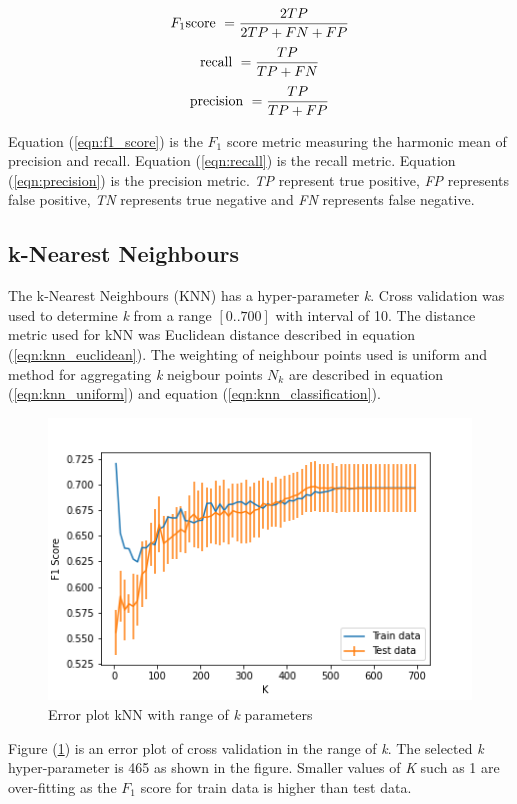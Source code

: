\documentclass[transmag]{IEEEtran}
\begin{document}
\begin{equation}
\label{eqn:f1_score}
F_1 \textnormal{score}\ = \frac{2TP}{2TP+FN+FP}
\end{equation}
\begin{equation}
\label{eqn:recall}
\textnormal{recall}\ = \frac{TP}{TP+FN}
\end{equation}
\begin{equation}
\label{eqn:precision}
\textnormal{precision}\ = \frac{TP}{TP+FP}
\end{equation}

\noindent Equation (\ref{eqn:f1_score}) is the $F_1$ score metric measuring the harmonic mean of precision and recall. Equation (\ref{eqn:recall}) is the recall metric. Equation (\ref{eqn:precision}) is the precision metric. \emph{TP} represent true positive, \emph{FP} represents false positive, \emph{TN} represents true negative and \emph{FN} represents false negative.

\subsection{k-Nearest Neighbours}
\noindent The k-Nearest Neighbours (KNN) has a hyper-parameter \emph{k}. Cross validation was used to determine \emph{k} from a range $[0..700]$ with interval of 10. The distance metric used for kNN was Euclidean distance described in equation (\ref{eqn:knn_euclidean}). The weighting of neighbour points used is uniform and method for aggregating \emph{k} neigbour points $N_k$ are described in equation (\ref{eqn:knn_uniform}) and equation (\ref{eqn:knn_classification}).

\begin{figure}[h]
	\includegraphics[width=\columnwidth]{knn_cv_k.png} 
    \caption{Error plot kNN with range of \emph{k} parameters}%
    \label{fig:knn_k}%
\end{figure}
\noindent Figure (\ref{fig:knn_k}) is an error plot of cross validation in the range of \emph{k}. The selected \emph{k} hyper-parameter is 465 as shown in the figure. Smaller values of \emph{K} such as 1 are over-fitting as the $F_1$ score  for train data is higher than test data.
\end{document}
